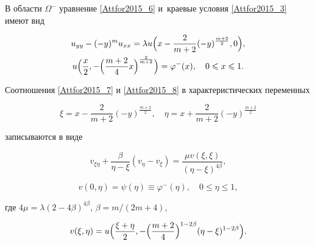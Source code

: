 В области $\Omega^-$ уравнение \eqref{Attfor2015_6} и~краевые условия \eqref{Attfor2015_3} имеют вид

\begin{gather}

\label{Attfor2015_7}

u_{yy}-(-y)^m u_{xx}=\lambda u\Bigl( x-\frac{2}{m+2}(-y)^{\frac{m+2}{2}} , 0 \Bigr),

\\

\label{Attfor2015_8}

u\Bigl(\frac{x}{2}, - \Bigl(\frac{m+2}{4} x\Bigr)^\frac{2}{m+2}\Bigr)

=\varphi^{-} (x), \quad 0\leqslant x \leqslant 1.

\end{gather}

Соотношения \eqref{Attfor2015_7} и \eqref{Attfor2015_8} в характеристических переменных

\begin{equation}

\label{Attfor2015_9}

\xi=x-\frac{2}{m+2}(-y)^{\frac{m+2}{2}}, \quad \eta=x+\frac{2}{m+2}(-y)^{\frac{m+2}{2}}

\end{equation}

записываются в виде

\begin{equation}

\label{Attfor2015_10}

v_{\xi\eta}+\frac{\beta}{\eta-\xi}(v_\eta-v_\xi)=\frac{\mu v(\xi,\xi)}{(\eta-\xi)^{4\beta}},

\end{equation}

\begin{equation}

\label{Attfor2015_11}

v(0,\eta)=\psi(\eta)\equiv \varphi^-(\eta),\quad 0\leqslant\eta\leqslant 1,

\end{equation}

где $4\mu=\lambda(2-4\beta)^{4\beta}$, $\beta={m}/({2m+4})$,

$$

v(\xi,\eta)=u\Bigl(\frac{\xi+\eta}{2},

-\Bigl(\frac{m+2}{4} \Bigr)^{1-2\beta}(\eta-\xi)^{1-2\beta}\Bigr).

$$



